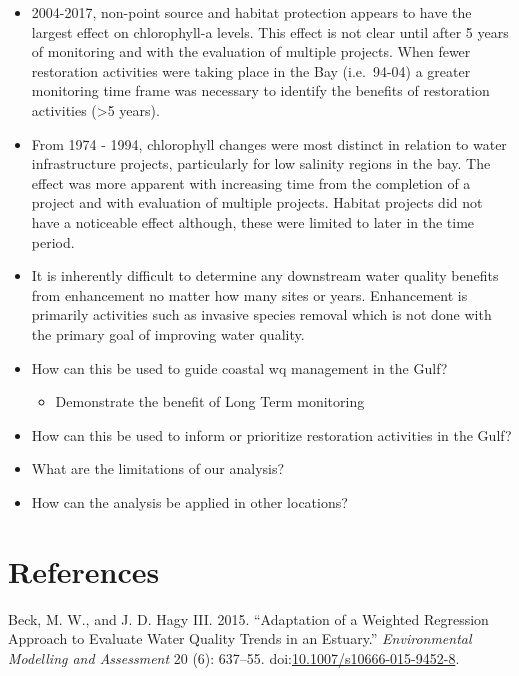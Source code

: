 \documentclass[]{article}
\providecommand{\tightlist}{%
  \setlength{\itemsep}{0pt}\setlength{\parskip}{0pt}}
\begin{document}
\begin{itemize}
\item
  2004-2017, non-point source and habitat protection appears to have the
  largest effect on chlorophyll-a levels. This effect is not clear until
  after 5 years of monitoring and with the evaluation of multiple
  projects. When fewer restoration activities were taking place in the
  Bay (i.e.~94-04) a greater monitoring time frame was necessary to
  identify the benefits of restoration activities (\textgreater{}5
  years).
\item
  From 1974 - 1994, chlorophyll changes were most distinct in relation
  to water infrastructure projects, particularly for low salinity
  regions in the bay. The effect was more apparent with increasing time
  from the completion of a project and with evaluation of multiple
  projects. Habitat projects did not have a noticeable effect although,
  these were limited to later in the time period.
\item
  It is inherently difficult to determine any downstream water quality
  benefits from enhancement no matter how many sites or years.
  Enhancement is primarily activities such as invasive species removal
  which is not done with the primary goal of improving water quality.
\item
  How can this be used to guide coastal wq management in the Gulf?

  \begin{itemize}
  \tightlist
  \item
    Demonstrate the benefit of Long Term monitoring
  \end{itemize}
\item
  How can this be used to inform or prioritize restoration activities in
  the Gulf?
\item
  What are the limitations of our analysis?
\item
  How can the analysis be applied in other locations?
\end{itemize}

\section*{References}\label{references}

\hypertarget{refs}{}
\hypertarget{ref-Beck15}{}
Beck, M. W., and J. D. Hagy III. 2015. ``Adaptation of a Weighted
Regression Approach to Evaluate Water Quality Trends in an Estuary.''
\emph{Environmental Modelling and Assessment} 20 (6): 637--55.
doi:\href{https://doi.org/10.1007/s10666-015-9452-8}{10.1007/s10666-015-9452-8}.
\end{document}
